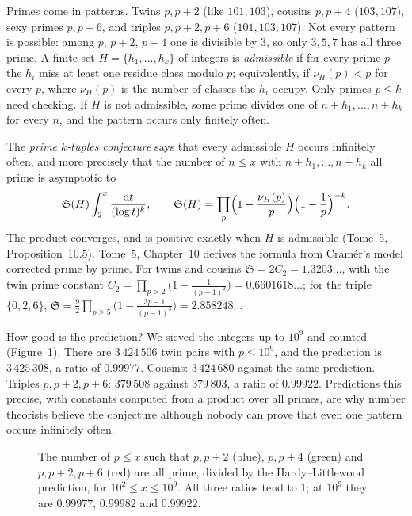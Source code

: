 Primes come in patterns. Twins $p,p+2$ (like $101,103$), cousins $p,p+4$ ($103,107$), sexy primes $p,p+6$, and triples $p,p+2,p+6$ ($101,103,107$).
Not every pattern is possible: among $p$, $p+2$, $p+4$ one is divisible by $3$, so only $3,5,7$ has all three prime. A finite set
$H=\{h_1,\dots,h_k\}$ of integers is \emph{admissible} if for every prime $p$ the $h_i$ miss at least one residue class modulo $p$; equivalently,
if $\nu_H(p)<p$ for every $p$, where $\nu_H(p)$ is the number of classes the $h_i$ occupy. Only primes $p\le k$ need checking. If $H$ is not
admissible, some prime divides one of $n+h_1,\dots,n+h_k$ for every $n$, and the pattern occurs only finitely often.

\begin{remark}
The \emph{prime $k$-tuples conjecture} says that every admissible $H$ occurs infinitely often, and more precisely that the number of $n\le x$ with
$n+h_1,\dots,n+h_k$ all prime is asymptotic to
\[
\mathfrak S(H)\int_2^x\frac{\mathrm dt}{(\log t)^k},\qquad\mathfrak S(H)=\prod_p\Bigl(1-\frac{\nu_H(p)}p\Bigr)\Bigl(1-\frac1p\Bigr)^{-k}.
\]
The product converges, and is positive exactly when $H$ is admissible (Tome~5, Proposition~10.5). Tome~5, Chapter~10 derives the formula from
Cram\'er's model corrected prime by prime. For twins and cousins $\mathfrak S=2C_2=1.3203\ldots$, with the twin prime constant
$C_2=\prod_{p>2}\bigl(1-\frac1{(p-1)^2}\bigr)=0.6601618\ldots$; for the triple $\{0,2,6\}$, $\mathfrak S=\frac92\prod_{p\ge5}\bigl(1-\frac{3p-1}{(p-1)^3}\bigr)=2.858248\ldots$
\end{remark}

How good is the prediction? We sieved the integers up to $10^9$ and counted (Figure~\ref{fig:tuples}). There are $3\,424\,506$ twin pairs with
$p\le10^9$, and the prediction is $3\,425\,308$, a ratio of $0.99977$. Cousins: $3\,424\,680$ against the same prediction. Triples $p,p+2,p+6$: $379\,508$ against
$379\,803$, a ratio of $0.99922$. Predictions this precise, with constants computed from a product over all primes, are why number theorists believe
the conjecture although nobody can prove that even one pattern occurs infinitely often.

\begin{figure}[ht]
\centering
{}
\caption{The number of $p\le x$ such that $p,p+2$ (blue), $p,p+4$ (green) and $p,p+2,p+6$ (red) are all prime, divided by the Hardy--Littlewood
prediction, for $10^2\le x\le10^9$. All three ratios tend to $1$; at $10^9$ they are $0.99977$, $0.99982$ and $0.99922$.}
\label{fig:tuples}
\end{figure}

